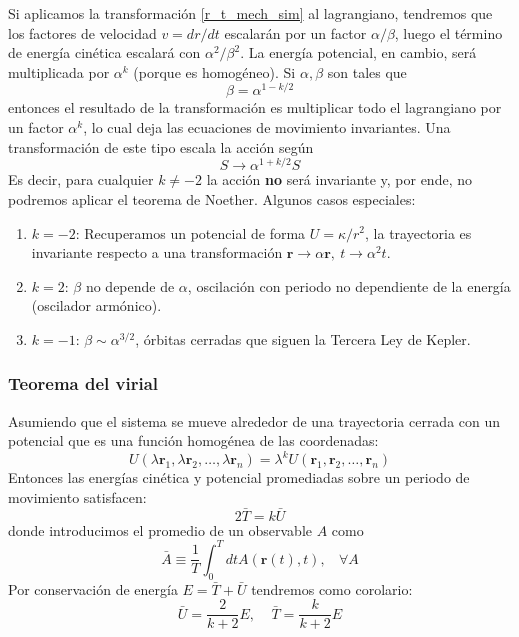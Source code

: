 \documentclass[]{article}
\numberwithin{equation}{section}
\begin{document}
Si aplicamos la transformación \ref{r_t_mech_sim} al lagrangiano, tendremos que los factores de velocidad \(v=dr/dt\) escalarán por un factor \(\alpha/\beta\), luego el término de energía cinética escalará con \(\alpha^2/\beta^2\). La energía potencial, en cambio, será multiplicada por \(\alpha^k\) (porque es homogéneo). Si \(\alpha, \beta\) son tales que
\begin{equation*}
	\beta = \alpha^{1-k/2}
\end{equation*}
entonces el resultado de la transformación es multiplicar todo el lagrangiano por un factor \(\alpha^k\), lo cual deja las ecuaciones de movimiento invariantes. Una transformación de este tipo escala la acción según
\begin{equation}
	S \rightarrow \alpha^{1+k/2} S
\end{equation}
Es decir, para cualquier \(k \neq -2\) la acción \textbf{no} será invariante y, por ende, no podremos aplicar el teorema de Noether.
Algunos casos especiales:
\begin{enumerate}
	\item \(k = -2\): Recuperamos un potencial de forma \(U = \kappa/r^2\), la trayectoria es invariante respecto a una transformación \(\mathbf{r}\rightarrow\alpha\mathbf{r}, ~t\rightarrow\alpha^2 t\).
	\item \(k = 2\): \(\beta\) no depende de \(\alpha\), oscilación con periodo no dependiente de la energía (oscilador armónico).
	\item \(k = -1\): \(\beta\sim\alpha^{3/2}\), órbitas cerradas que siguen la Tercera Ley de Kepler.
\end{enumerate}

\subsubsection{Teorema del virial}
Asumiendo que el sistema se mueve alrededor de una trayectoria cerrada con un potencial que es una función homogénea de las coordenadas:
\begin{equation*}
	U(\lambda\mathbf{r}_1, \lambda\mathbf{r}_2, \ldots, \lambda\mathbf{r}_n) = \lambda^k U(\mathbf{r}_1, \mathbf{r}_2, \ldots, \mathbf{r}_n)
\end{equation*}
Entonces las energías cinética y potencial promediadas sobre un periodo de movimiento satisfacen:
\begin{equation}
	2\bar{T} = k \bar{U}\label{virial_teo}
\end{equation}
donde introducimos el promedio de un observable \(A\) como
\begin{equation}
	\bar{A} \equiv \frac{1}{T} \int_0^T dt A(\mathbf{r}(t), t),\ \ \ \ \forall A
\end{equation}
Por conservación de energía \(E = \bar{T} + \bar{U}\) tendremos como corolario:
\begin{equation}
	\bar{U} = \frac{2}{k + 2}E,\ \ \ \ \ \bar{T} = \frac{k}{k + 2}E
\end{equation}
\end{document}
